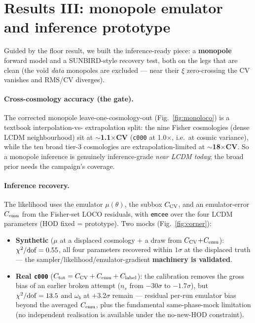 \documentclass[11pt]{article}
\newcommand{\code}[1]{\texttt{#1}}
\begin{document}
\section{Results III: monopole emulator and inference prototype}
Guided by the floor result, we built the inference-ready piece: a \textbf{monopole}
forward model and a SUNBIRD-style recovery test, both on the legs that are clean
(the void \emph{data} monopoles are excluded --- near their $\xi$ zero-crossing the
CV vanishes and RMS/CV diverges).

\paragraph{Cross-cosmology accuracy (the gate).} The corrected monopole
leave-one-cosmology-out (Fig.~\ref{fig:monoloco}) is a textbook interpolation-vs-
extrapolation split: the nine Fisher cosmologies (dense LCDM neighbourhood) sit at
\textbf{$\sim$1.1$\times$CV} (\code{c000} at 1.0$\times$, i.e.\ at cosmic variance),
while the ten broad tier-3 cosmologies are extrapolation-limited at
\textbf{$\sim$18$\times$CV}. So a monopole inference is genuinely inference-grade
\emph{near LCDM today}; the broad prior needs the campaign's coverage.

\paragraph{Inference recovery.} The likelihood uses the emulator $\mu(\theta)$, the
subbox $C_{\rm CV}$, and an emulator-error $C_{\rm emu}$ from the Fisher-set LOCO
residuals, with \code{emcee} over the four LCDM parameters (HOD fixed = prototype).
Two mocks (Fig.~\ref{fig:corner}):
\begin{itemize}
\item \textbf{Synthetic} ($\mu$ at a displaced cosmology $+$ a draw from
  $C_{\rm CV}\!+\!C_{\rm emu}$): $\chi^2/{\rm dof}=0.55$, all four parameters
  recovered within $1\sigma$ at the displaced truth --- the
  sampler/likelihood/emulator-gradient \textbf{machinery is validated}.
\item \textbf{Real \code{c000}} ($C_{\rm tot}=C_{\rm CV}+C_{\rm emu}+C_{\rm label}$):
  the calibration removes the gross bias of an earlier broken attempt
  ($n_s$ from $-30\sigma$ to $-1.7\sigma$), but $\chi^2/{\rm dof}=13.5$ and
  $\omega_b$ at $+3.2\sigma$ remain --- residual per-run emulator bias beyond the
  averaged $C_{\rm emu}$, plus the fundamental same-phase-mock limitation (no
  independent realisation is available under the no-new-HOD constraint).
\end{itemize}
\end{document}
